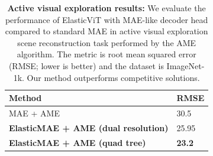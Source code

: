 \begin{table}[t]
\caption{\textbf{Active visual exploration results:} We evaluate the performance of ElasticViT with MAE-like decoder head compared to standard MAE in active visual exploration scene reconstruction task performed by the AME algorithm. The metric is root mean squared error (RMSE; lower is better) and the dataset is ImageNet-1k. Our method outperforms competitive solutions.}
\label{tab:ame}
\begin{center}
\begin{small}
\vspace{-.2cm}
\begin{tabular}{l@{\hskip20pt}l}
\toprule
Method & RMSE \\
\midrule
MAE + AME & 30.5  \\
\textbf{ElasticMAE + AME (dual resolution)} & 25.95 \\
\textbf{ElasticMAE + AME (quad tree)} & \textbf{23.2}  \\
\bottomrule
\end{tabular}
\end{small}
\end{center}
\end{table}